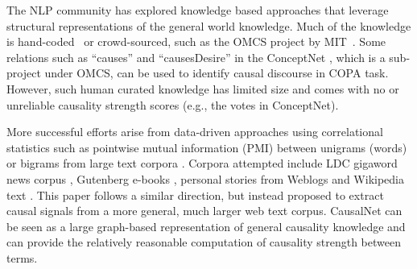 The NLP community has explored knowledge based approaches
that leverage structural representations of the general world knowledge. 
Much of the knowledge is hand-coded~\cite{lenat1995cyc} 
or crowd-sourced, such as the OMCS project by MIT~\cite{singh2002open}.
Some relations such as ``causes'' and
``causesDesire'' in the ConceptNet \cite{liu2004commonsense},
which is a sub-project under OMCS, can be used to identify causal
discourse in COPA task. However, such human curated knowledge
has limited size and comes with no or unreliable causality strength
scores (e.g., the votes in ConceptNet).


More successful efforts arise from data-driven approaches
using correlational statistics \cite{gordon2012copa} such as pointwise mutual
information (PMI) between unigrams (words) or bigrams from large
text corpora \cite{Mihalcea2006:CKM}. Corpora attempted include LDC
gigaword news corpus \cite{goodwin2012utdhlt}, Gutenberg e-books
\cite{roemmele2011choice}, personal stories from Weblogs
\cite{gordon2011commonsense} and Wikipedia text
\cite{jabeen2014exploiting}.
This paper follows a similar direction, but instead proposed to extract 
causal signals from a more general, much larger web text corpus. 
CausalNet can be seen as a large graph-based representation of general
causality knowledge and can provide the relatively reasonable computation of 
causality strength between terms.

